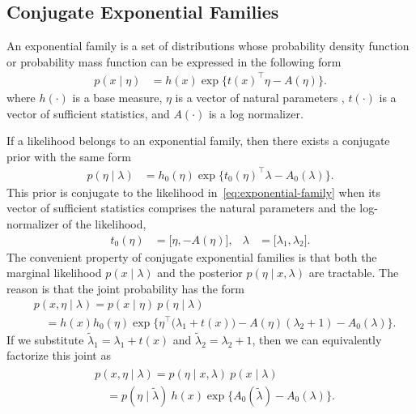 \documentclass{article}
\begin{document}
\subsection{Conjugate Exponential Families}
An exponential family is a set of distributions whose probability density function or probability mass function can be expressed in the following form
\begin{align}
\label{eq:exponential-family}
    p(x \mid \eta) 
    &= 
    h(x) \exp \big\{ 
        t(x)^\top \eta   
        - A(\eta) \big\}.
\end{align}
where $h(\cdot)$ is a base measure, $\eta$ is a vector of natural parameters , $t(\cdot)$ is a vector of sufficient statistics, and $A(\cdot)$ is a log normalizer.

If a likelihood belongs to an exponential family, then there exists a conjugate prior with the same form
\begin{align*}
    p(\eta \mid \lambda) 
    &= 
    h_0(\eta) \exp \big\{ 
    t_0(\eta)^\top \lambda
    - A_0(\lambda) \big\}.
\end{align*}   
This prior is conjugate to the likelihood in~\ref{eq:exponential-family} when its vector of sufficient statistics comprises the natural parameters and the log-normalizer of the likelihood,
\begin{align*}
    t_0(\eta) &= \big[ \eta, - A(\eta) \big], 
    &
    \lambda &= \big[ \lambda_1, \lambda_2 \big].
\end{align*}
The convenient property of conjugate exponential families is that both the marginal likelihood $p(x \mid \lambda)$ and the posterior $p(\eta \mid x, \lambda)$ are tractable. The reason is that the joint probability has the form
\begin{align*}
    & p(x, \eta \mid \lambda) = p(x \mid \eta) \: p(\eta \mid \lambda)\\
    & \quad
    =h(x)h_0(\eta)\exp \big\{ 
      \eta^\top \! \big(\lambda_1 \!+\! t(x)\big) 
      -
      A(\eta) (\lambda_2 \!+\! 1) 
      -
      A_0(\lambda)
    \big\}.
\end{align*}
If we substitute $\tilde{\lambda}_1 = \lambda_1 + t(x)$ and $\tilde{\lambda}_2 = \lambda_2 + 1$, then we can equivalently factorize this joint as
\begin{align}
    \label{eq:cef-joint}
    \begin{split}
    & p(x, \eta \mid \lambda) = p(\eta \mid x, \lambda) \: p(x \mid \lambda) \\
    & \quad = p(\eta \mid \tilde{\lambda}) \: h(x) \exp\big\{ A_0(\tilde{\lambda}) - A_0(\lambda) \big\}.
    \end{split}
\end{align}
\end{document}
